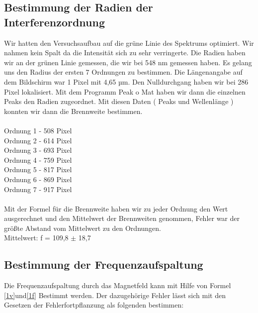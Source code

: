 \documentclass[10pt,a4paper]{article}
\begin{document}
\subsection {Bestimmung der Radien der Interferenzordnung}

Wir hatten den Versuchsaufbau auf die grüne Linie des Spektrums optimiert. Wir nahmen kein Spalt da die Intensität sich zu sehr verringerte. Die Radien haben wir an der grünen Linie gemessen, die wir bei 548 nm gemessen haben. Es gelang uns den Radius der ersten 7 Ordnungen zu bestimmen. Die Längenangabe auf dem Bildschirm war 1 Pixel mit 4,65 µm. Den Nulldurchgang haben wir bei 286 Pixel lokalisiert. Mit dem Programm Peak o Mat haben wir dann die einzelnen Peaks den Radien zugeordnet. Mit diesen Daten ( Peaks und Wellenlänge ) konnten wir dann die Brennweite bestimmen.\\
\\
Ordnung 1 - 508 Pixel\\
Ordnung 2 - 614 Pixel\\
Ordnung 3 - 693 Pixel\\
Ordnung 4 - 759 Pixel\\
Ordnung 5 - 817 Pixel\\
Ordnung 6 - 869 Pixel\\
Ordnung 7 - 917 Pixel\\
\\
Mit der Formel für die Brennweite haben wir zu jeder Ordnung den Wert ausgerechnet und den Mittelwert der Brennweiten genommen, Fehler war der größte Abstand vom Mittelwert zu den Ordnungen. \\
Mittelwert: f = 109,8 $\pm$ 18,7


\subsection{Bestimmung der Frequenzaufspaltung}

Die Frequenzaufspaltung durch das Magnetfeld kann mit Hilfe von Formel \ref{1v}und\ref{1f}	 Bestimmt werden. Der dazugehörige Fehler lässt sich mit den Gesetzen der Fehlerfortpflanzung als folgenden bestimmen:
\end{document}
